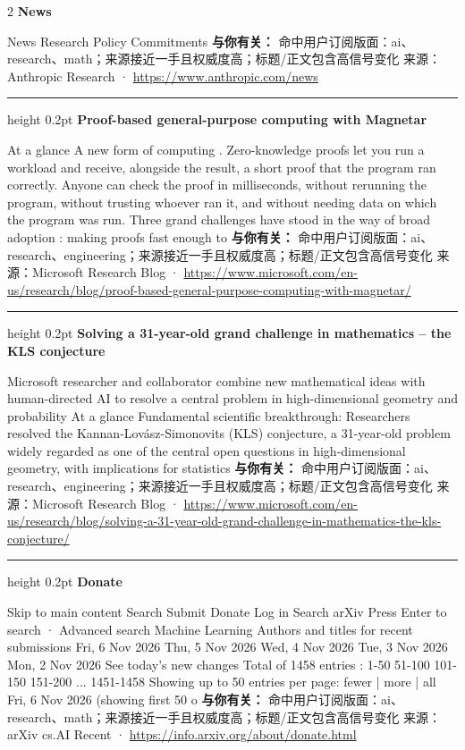 \documentclass[10.5pt]{ctexart}
\begin{document}
\begin{multicols}{2}
{\large\bfseries News}\par
News Research Policy Commitments
\textbf{与你有关：} 命中用户订阅版面：ai、research、math；来源接近一手且权威度高；标题/正文包含高信号变化
{\footnotesize\color{ormuted} 来源：Anthropic Research · \url{https://www.anthropic.com/news}}
\vspace{2mm}
\hrule height 0.2pt
\vspace{2mm}
{\large\bfseries Proof-based general-purpose computing with Magnetar}\par
At a glance A new form of computing . Zero-knowledge proofs let you run a workload and receive, alongside the result, a short proof that the program ran correctly. Anyone can check the proof in milliseconds, without rerunning the program, without trusting whoever ran it, and without needing data on which the program was run. Three grand challenges have stood in the way of broad adoption : making proofs fast enough to
\textbf{与你有关：} 命中用户订阅版面：ai、research、engineering；来源接近一手且权威度高；标题/正文包含高信号变化
{\footnotesize\color{ormuted} 来源：Microsoft Research Blog · \url{https://www.microsoft.com/en-us/research/blog/proof-based-general-purpose-computing-with-magnetar/}}
\vspace{2mm}
\hrule height 0.2pt
\vspace{2mm}
{\large\bfseries Solving a 31-year-old grand challenge in mathematics – the KLS conjecture}\par
Microsoft researcher and collaborator combine new mathematical ideas with human-directed AI to resolve a central problem in high-dimensional geometry and probability At a glance Fundamental scientific breakthrough: Researchers resolved the Kannan-Lovász-Simonovits (KLS) conjecture, a 31-year-old problem widely regarded as one of the central open questions in high-dimensional geometry, with implications for statistics
\textbf{与你有关：} 命中用户订阅版面：ai、research、engineering；来源接近一手且权威度高；标题/正文包含高信号变化
{\footnotesize\color{ormuted} 来源：Microsoft Research Blog · \url{https://www.microsoft.com/en-us/research/blog/solving-a-31-year-old-grand-challenge-in-mathematics-the-kls-conjecture/}}
\vspace{2mm}
\hrule height 0.2pt
\vspace{2mm}
{\large\bfseries Donate}\par
Skip to main content Search Submit Donate Log in Search arXiv Press Enter to search · Advanced search Machine Learning Authors and titles for recent submissions Fri, 6 Nov 2026 Thu, 5 Nov 2026 Wed, 4 Nov 2026 Tue, 3 Nov 2026 Mon, 2 Nov 2026 See today's new changes Total of 1458 entries : 1-50 51-100 101-150 151-200 ... 1451-1458 Showing up to 50 entries per page: fewer | more | all Fri, 6 Nov 2026 (showing first 50 o
\textbf{与你有关：} 命中用户订阅版面：ai、research、math；来源接近一手且权威度高；标题/正文包含高信号变化
{\footnotesize\color{ormuted} 来源：arXiv cs.AI Recent · \url{https://info.arxiv.org/about/donate.html}}
\end{multicols}
\end{document}
